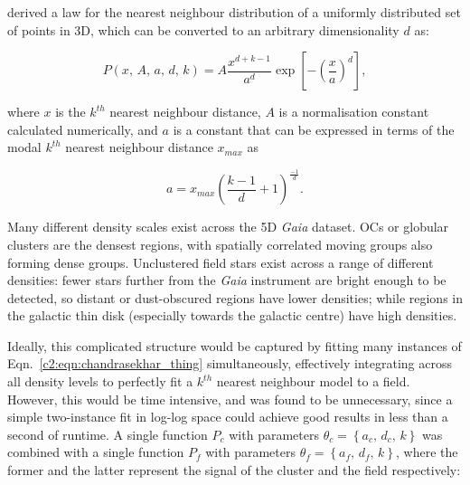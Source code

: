 \cite{chandrasekhar_stochastic_1943} derived a law for the nearest neighbour distribution of a uniformly distributed set of points in 3D, which can be converted to an arbitrary dimensionality $d$ as:

\begin{equation}\label{c2:eqn:chandrasekhar_thing}
    P \left( x, \, A, \, a, \, d, \, k\right) = 
    A \frac{x^{d + k - 1}}{a^d} \exp \left[ - \left( \frac{x}{a} \right) ^d \right],
\end{equation}

\noindent
where $x$ is the $k^{th}$ nearest neighbour distance, $A$ is a normalisation constant calculated numerically, and $a$ is a constant that can be expressed in terms of the modal $k^{th}$ nearest neighbour distance $x_{max}$ as 

\begin{equation}\label{c2:eqn:xmax}
    a = x_{max} \left( \frac{k-1}{d} + 1 \right)^{\frac{-1}{d}}.
\end{equation}

Many different density scales exist across the 5D \emph{Gaia} dataset. OCs or globular clusters are the densest regions, with spatially correlated moving groups \citep[such as those found by][]{kounkel_untangling_2019, kounkel_untangling_2020} also forming dense groups. Unclustered field stars exist across a range of different densities: fewer stars further from the \emph{Gaia} instrument are bright enough to be detected, so distant or dust-obscured regions have lower densities; while regions in the galactic thin disk (especially towards the galactic centre) have high densities. 

Ideally, this complicated structure would be captured by fitting many instances of Eqn.~\ref{c2:eqn:chandrasekhar_thing} simultaneously, effectively integrating across all density levels to perfectly fit a $k^{th}$ nearest neighbour model to a field. However, this would be time intensive, and was found to be unnecessary, since a simple two-instance fit in log-log space could achieve good results in less than a second of runtime. A single function $P_c$ with parameters $\theta_c = \left\{ a_c, \, d_c, \, k \right\}$ was combined with a single function $P_f$ with parameters $\theta_f = \left\{ a_f, \, d_f, \, k \right\}$, where the former and the latter represent the signal of the cluster and the field respectively:


